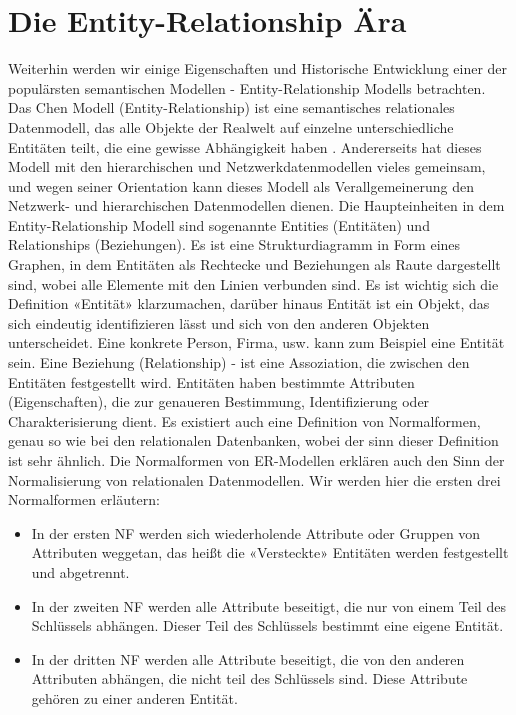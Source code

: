     

\section{Die Entity-Relationship Ära}

Weiterhin werden wir einige Eigenschaften und Historische Entwicklung einer der populärsten semantischen Modellen - Entity-Relationship Modells betrachten. Das Chen Modell (Entity-Relationship) ist eine semantisches relationales Datenmodell, das alle Objekte der Realwelt auf einzelne unterschiedliche Entitäten teilt, die eine gewisse Abhängigkeit haben \cite{chen1976entity}.  Andererseits hat dieses Modell mit den hierarchischen und Netzwerkdatenmodellen vieles gemeinsam, und wegen seiner Orientation kann dieses Modell als Verallgemeinerung den Netzwerk- und hierarchischen Datenmodellen dienen. Die Haupteinheiten in dem Entity-Relationship Modell sind sogenannte Entities (Entitäten) und Relationships (Beziehungen). Es ist eine Strukturdiagramm in Form eines Graphen, in dem Entitäten als Rechtecke und Beziehungen als Raute dargestellt sind, wobei alle Elemente mit den Linien verbunden sind. Es ist wichtig sich die Definition «Entität» klarzumachen, darüber hinaus Entität ist ein Objekt, das sich eindeutig identifizieren lässt und sich von den anderen Objekten unterscheidet. Eine konkrete Person, Firma, usw. kann zum Beispiel eine Entität sein. Eine Beziehung (Relationship) - ist eine Assoziation, die zwischen den Entitäten festgestellt wird. Entitäten haben bestimmte Attributen (Eigenschaften), die zur genaueren Bestimmung, Identifizierung oder Charakterisierung dient. Es existiert auch eine Definition von Normalformen, genau so wie bei den relationalen Datenbanken, wobei der sinn dieser Definition ist sehr ähnlich. Die Normalformen von ER-Modellen erklären auch den Sinn der Normalisierung von relationalen Datenmodellen. Wir werden hier die ersten drei Normalformen erläutern:
\begin{itemize}
\item  In der ersten NF werden sich wiederholende Attribute oder Gruppen von Attributen weggetan, das heißt die «Versteckte» Entitäten werden festgestellt und abgetrennt.
\item  In der zweiten NF werden alle Attribute beseitigt, die nur von einem Teil des Schlüssels abhängen. Dieser Teil des Schlüssels bestimmt eine eigene Entität. 
\item  In der dritten NF werden alle Attribute beseitigt, die von den anderen Attributen abhängen, die nicht teil des Schlüssels sind. Diese Attribute gehören zu einer anderen Entität.
\end{itemize}


